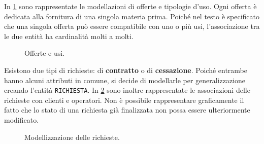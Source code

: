 \documentclass[a4paper,12pt]{report}
\begin{document}
In \cref{fig:plans-uses} sono rappresentate le modellazioni di offerte e tipologie d'uso. Ogni offerta è dedicata alla fornitura di una singola materia prima. Poiché nel testo è specificato che una singola offerta può essere compatibile con uno o più usi, l'associazione tra le due entità ha cardinalità molti a molti.

\begin{figure}[H]
\centering{}
\caption{Offerte e usi.}
\label{fig:plans-uses}
\end{figure}


Esistono due tipi di richieste: di \textbf{contratto} o di \textbf{cessazione}. Poiché entrambe hanno alcuni attributi in comune, si decide di modellarle per generalizzazione creando l'entità \texttt{RICHIESTA}. In \cref{fig:requests} sono inoltre rappresentate le associazioni delle richieste con clienti e operatori. Non è possibile rappresentare graficamente il fatto che lo stato di una richiesta già finalizzata non possa essere ulteriormente modificato.

\begin{figure}[H]
\centering{}
\caption{Modellizzazione delle richieste.}
\label{fig:requests}
\end{figure}
\end{document}
